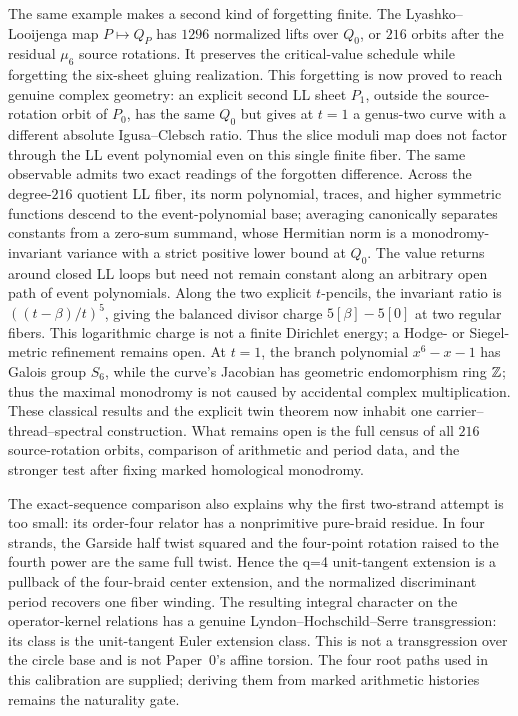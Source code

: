 The same example makes a second kind of forgetting finite.  The
Lyashko--Looijenga map $P\mapsto Q_P$ has $1296$ normalized lifts over $Q_0$,
or $216$ orbits after the residual $\mu_6$ source rotations.  It preserves the
critical-value schedule while forgetting the six-sheet gluing realization.
This forgetting is now proved to reach genuine complex geometry: an explicit
second LL sheet $P_1$, outside the source-rotation orbit of $P_0$, has the same
$Q_0$ but gives at $t=1$ a genus-two curve with a different absolute
Igusa--Clebsch ratio.  Thus the slice moduli map does not factor through the
LL event polynomial even on this single finite fiber.
The same observable admits two exact readings of the forgotten difference.
Across the degree-$216$ quotient LL fiber, its norm polynomial, traces, and
higher symmetric functions descend to the event-polynomial base; averaging
canonically separates constants from a zero-sum summand, whose Hermitian norm is
a monodromy-invariant variance with a strict positive lower bound at $Q_0$.
The value returns around closed LL loops but need not remain constant along an
arbitrary open path of event polynomials.  Along the two explicit $t$-pencils,
the invariant ratio is $((t-\beta)/t)^5$, giving the balanced divisor charge
$5[\beta]-5[0]$ at two regular fibers.  This logarithmic charge is not a finite
Dirichlet energy; a Hodge- or Siegel-metric refinement remains open.
At $t=1$, the branch polynomial $x^6-x-1$ has Galois group $S_6$, while the
curve's Jacobian has geometric endomorphism ring $\mathbb{Z}$; thus the maximal
monodromy is not caused by accidental
complex multiplication.  These classical results and the explicit twin theorem now
inhabit one carrier--thread--spectral construction.  What remains open is the
full census of all $216$ source-rotation orbits, comparison of arithmetic and
period data, and the stronger test after fixing marked homological monodromy.

The exact-sequence comparison also explains why the first two-strand attempt is
too small: its order-four relator has a nonprimitive pure-braid residue.  In four
strands, the Garside half twist squared and the four-point rotation raised to the
fourth power are the same full twist.  Hence the q=4 unit-tangent extension is a
pullback of the four-braid center extension, and the normalized discriminant
period recovers one fiber winding.  The resulting integral character on the
operator-kernel relations has a genuine Lyndon--Hochschild--Serre transgression:
its class is the unit-tangent Euler extension class.  This is not a transgression
over the circle base and is not Paper~0's affine torsion.  The four root paths
used in this calibration are supplied; deriving them from marked arithmetic
histories remains the naturality gate.

